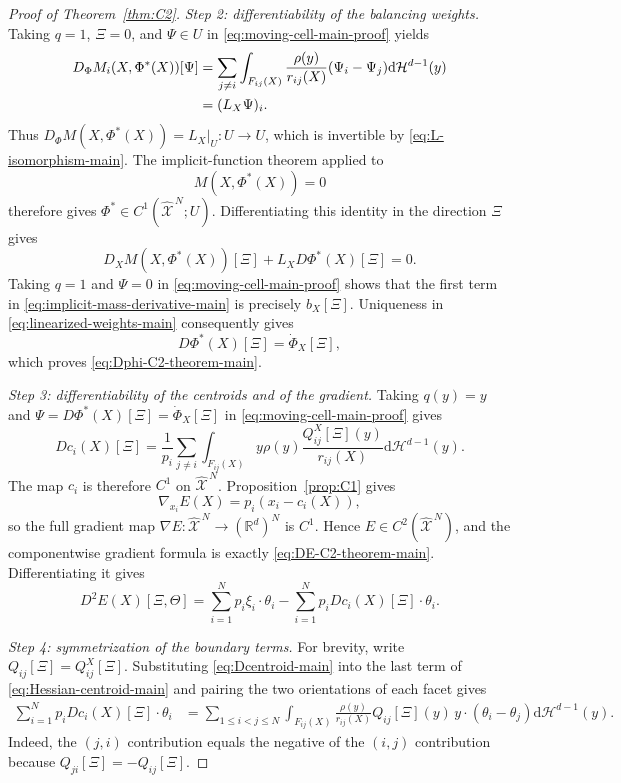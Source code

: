 \documentclass[11pt]{article}
\def\R{\mathbb{R}}
\def\Xc{{\mathcal X}}
\def\hX{\widehat{\Xc}^{\,N}}
\newcommand{\dd}{\mathrm{d}}
\newcommand{\HH}{\mathcal H}
\theoremstyle{definition}
\theoremstyle{remark}
\numberwithin{equation}{section}
\begin{document}
\begin{proof}[Proof of Theorem~\ref{thm:C2}]
\medskip
\noindent\textit{Step 2: differentiability of the balancing weights.}
Taking $q=1$, $\Xi=0$, and $\Psi\in U$ in
\eqref{eq:moving-cell-main-proof} yields
\begin{align}
 D_\Phi M_i(X,\Phi^*(X))[\Psi]
 &=\sum_{j\ne i}\int_{F_{ij}(X)}\frac{\rho(y)}{r_{ij}(X)}
 (\Psi_i-\Psi_j)\dd\HH^{d-1}(y)\notag\\
 &=(L_X\Psi)_i.
 \label{eq:DphiM-L}
\end{align}
Thus
$D_\Phi M(X,\Phi^*(X))=L_X|_U:U\to U$, which is invertible by
\eqref{eq:L-isomorphism-main}.  The implicit-function theorem applied to
\[
 M(X,\Phi^*(X))=0
\]
therefore gives $\Phi^*\in C^1(\hX;U)$.  Differentiating this identity in the direction $\Xi$ gives
\begin{equation}\label{eq:implicit-mass-derivative-main}
 D_XM(X,\Phi^*(X))[\Xi]+L_XD\Phi^*(X)[\Xi]=0.
\end{equation}
Taking $q=1$ and $\Psi=0$ in \eqref{eq:moving-cell-main-proof} shows that the first term in
\eqref{eq:implicit-mass-derivative-main} is precisely $b_X[\Xi]$.  Uniqueness in
\eqref{eq:linearized-weights-main} consequently gives
\[
 D\Phi^*(X)[\Xi]=\dot\Phi_X[\Xi],
\]
which proves \eqref{eq:Dphi-C2-theorem-main}.

\medskip
\noindent\textit{Step 3: differentiability of the centroids and of the gradient.}
Taking $q(y)=y$ and
$\Psi=D\Phi^*(X)[\Xi]=\dot\Phi_X[\Xi]$ in
\eqref{eq:moving-cell-main-proof} gives
\begin{equation}\label{eq:Dcentroid-main}
 Dc_i(X)[\Xi]
 =\frac1{p_i}\sum_{j\ne i}
 \int_{F_{ij}(X)}y\rho(y)
 \frac{Q_{ij}^X[\Xi](y)}{r_{ij}(X)}
 \dd\HH^{d-1}(y).
\end{equation}
The map $c_i$ is therefore $C^1$ on $\hX$.  Proposition~\ref{prop:C1} gives
\[
 \nabla_{x_i}E(X)=p_i(x_i-c_i(X)),
\]
so the full gradient map $\nabla E:\hX\to(\R^d)^N$ is $C^1$.  Hence
$E\in C^2(\hX)$, and the componentwise gradient formula is exactly
\eqref{eq:DE-C2-theorem-main}.  Differentiating it gives
\begin{equation}\label{eq:Hessian-centroid-main}
 D^2E(X)[\Xi,\Theta]
 =\sum_{i=1}^Np_i\xi_i\cdot\theta_i
 -\sum_{i=1}^Np_iDc_i(X)[\Xi]\cdot\theta_i.
\end{equation}

\medskip
\noindent\textit{Step 4: symmetrization of the boundary terms.}
For brevity, write $Q_{ij}[\Xi]=Q_{ij}^X[\Xi]$.  Substituting
\eqref{eq:Dcentroid-main} into the last term of
\eqref{eq:Hessian-centroid-main} and pairing the two orientations of each facet gives
\begin{align}
 \sum_{i=1}^Np_iDc_i(X)[\Xi]\cdot\theta_i
 &=\sum_{1\le i<j\le N}\int_{F_{ij}(X)}\frac{\rho(y)}{r_{ij}(X)}
 Q_{ij}[\Xi](y)\,y\cdot(\theta_i-\theta_j)
 \dd\HH^{d-1}(y).
 \label{eq:hessian-paired-main}
\end{align}
Indeed, the $(j,i)$ contribution equals the negative of the $(i,j)$ contribution because
$Q_{ji}[\Xi]=-Q_{ij}[\Xi]$.


\end{proof}
\end{document}

